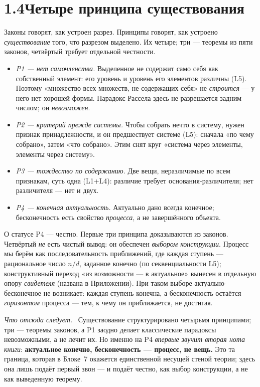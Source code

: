 \documentclass[12pt,a4paper]{article}
\newcommand{\rezultat}{\medskip\noindent\emph{Что отсюда следует.}\ }
\begin{document}
\section*{1.4\quad Четыре принципа существования}

Законы говорят, как устроен разрез. Принципы говорят, как устроено \emph{существование}
того, что разрезом выделено. Их четыре; три --- теоремы из пяти законов, четвёртый требует
отдельной честности.

\begin{itemize}
\item \emph{P1 --- нет само\-членства.} Выделенное не содержит само себя как собственный
элемент: его уровень и уровень его элементов различны (L5). Поэтому «множество всех множеств,
не содержащих себя» не \emph{строится} --- у него нет хорошей формы. Парадокс Рассела здесь не
разрешается задним числом; он \emph{невозможен}.
\item \emph{P2 --- критерий прежде системы.} Чтобы собрать нечто в систему, нужен признак
принадлежности, и он предшествует системе (L5): сначала «по чему собрано», затем «что
собрано». Этим снят круг «система через элементы, элементы через систему».
\item \emph{P3 --- тождество по содержанию.} Две вещи, неразличимые по всем признакам, суть
одна (L1+L4): различие требует основания-различителя; нет различителя --- нет и двух.
\item \emph{P4 --- конечная актуальность.} Актуально дано всегда конечное; бесконечность есть
свойство \emph{процесса}, а не завершённого объекта.
\end{itemize}

О статусе P4 --- честно. Первые три принципа доказываются из законов. Четвёртый \emph{не} есть
чистый вывод: он обеспечен \emph{выбором конструкции}. Процесс мы берём как последовательность
приближений, где каждая ступень --- рациональное число $n/d$, заданное конечно (по
секвенциальности L5); конструктивный переход «из возможности --- в актуальное» вынесен в
отдельную опору \emph{свидетеля} (названа в Приложении). При таком выборе актуально-бесконечное
не возникает: каждая ступень конечна, а бесконечность остаётся \emph{горизонтом} процесса ---
тем, к чему он приближается, не достигая.

\rezultat
Существование структурировано четырьмя принципами; три --- теоремы законов, а P1 заодно делает
классические парадоксы невозможными, а не лечит их. Но именно на P4 \emph{впервые звучит вторая
нота книги}: \textbf{актуальное конечно, бесконечность --- процесс, не вещь.} Это та граница,
которая в Блоке~7 окажется единственной несущей стеной теории; здесь она лишь подаёт первый
звон --- и подаёт честно, как выбор конструкции, а не как выведенную теорему.
\end{document}

